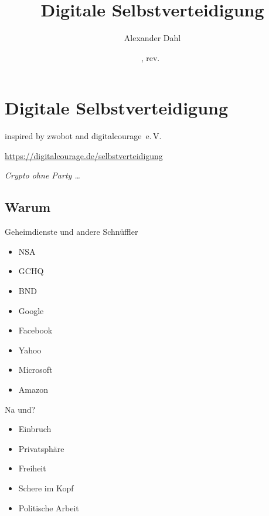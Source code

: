 \documentclass{beamer}
\title{Digitale Selbstverteidigung}
\author{Alexander Dahl}
\institute{Netz39 e.\,V.}
\date{\gitAuthorDate, rev.~\gitAbbrevHash}
\begin{document}
\begin{frame}
	\titlepage
\end{frame}

\logo{
    
}


\section{Digitale Selbstverteidigung}

\begin{frame}
    \begin{center}
        inspired by zwobot and digitalcourage~e.\,V.

        \url{https://digitalcourage.de/selbstverteidigung}

        \emph{Crypto ohne Party …}
    \end{center}
\end{frame}

\subsection{Warum}

\begin{frame}{Geheimdienste und andere Schnüffler}
    \begin{itemize}
        \item NSA
        \item GCHQ
        \item BND
        \pause
        \item Google
        \item Facebook
        \item Yahoo
        \item Microsoft
        \item Amazon
    \end{itemize}
\end{frame}

\begin{frame}{Na und?}
    \begin{itemize}
        \item Einbruch
        \item Privatsphäre
        \item Freiheit
        \item Schere im Kopf
        \item Politische Arbeit
    \end{itemize}
\end{frame}
\end{document}
